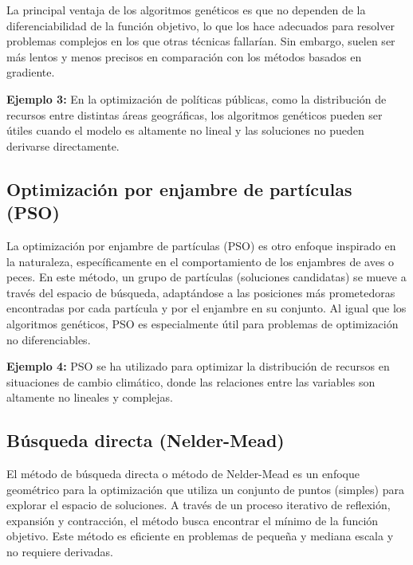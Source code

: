 \begin{flushleft}
	La principal ventaja de los algoritmos genéticos es que no dependen de la diferenciabilidad de la función objetivo, lo que los hace adecuados para resolver problemas complejos en los que otras técnicas fallarían. Sin embargo, suelen ser más lentos y menos precisos en comparación con los métodos basados en gradiente.
\end{flushleft}

\begin{flushleft}
	\textbf{Ejemplo 3:} En la optimización de políticas públicas, como la distribución de recursos entre distintas áreas geográficas, los algoritmos genéticos pueden ser útiles cuando el modelo es altamente no lineal y las soluciones no pueden derivarse directamente.
\end{flushleft}

\subsection{Optimización por enjambre de partículas (PSO)}

\begin{flushleft}
	La optimización por enjambre de partículas (PSO) es otro enfoque inspirado en la naturaleza, específicamente en el comportamiento de los enjambres de aves o peces. En este método, un grupo de partículas (soluciones candidatas) se mueve a través del espacio de búsqueda, adaptándose a las posiciones más prometedoras encontradas por cada partícula y por el enjambre en su conjunto. Al igual que los algoritmos genéticos, PSO es especialmente útil para problemas de optimización no diferenciables.
\end{flushleft}

\begin{flushleft}
	\textbf{Ejemplo 4:} PSO se ha utilizado para optimizar la distribución de recursos en situaciones de cambio climático, donde las relaciones entre las variables son altamente no lineales y complejas.
\end{flushleft}

\subsection{Búsqueda directa (Nelder-Mead)}

\begin{flushleft}
	El método de búsqueda directa o método de Nelder-Mead es un enfoque geométrico para la optimización que utiliza un conjunto de puntos (simples) para explorar el espacio de soluciones. A través de un proceso iterativo de reflexión, expansión y contracción, el método busca encontrar el mínimo de la función objetivo. Este método es eficiente en problemas de pequeña y mediana escala y no requiere derivadas.
\end{flushleft}


